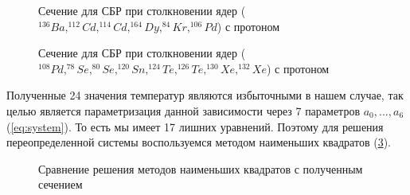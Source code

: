 \documentclass[%
master,    %
natbib,      %
subf,        %
href,        %
colorlinks,  %
]{disser}
\begin{document}
\begin{figure}
 	\caption{Сечение для СБР при столкновении ядер ($^{136}Ba, ^{112}Cd, ^{114}Cd, ^{164}Dy, ^{84}Kr, ^{106}Pd$) с протоном}
 	\label{ris:sigma-full}
\end{figure}
\begin{figure}
	\caption{Сечение для СБР при столкновении ядер ($^{108}Pd, ^{78}Se, ^{80}Se, ^{120}Sn, ^{124}Te, ^{126}Te, ^{130}Xe, ^{132}Xe$) с протоном}
	\label{ris:sigma-full-2}
\end{figure}

Полученные 24 значения температур являются избыточными в нашем случае, так целью является параметризация данной зависимости через 7 параметров $a_0, ..., a_6$ (\ref{eq:system}). То есть мы имеет 17 лишних уравнений. Поэтому для решения переопределенной системы воспользуемся методом наименьших квадратов (\ref{ris:2}).

\begin{figure}[h]
	\caption{Сравнение решения методов наименьших квадратов с полученным сечением}
	\label{ris:2}
\end{figure}
\end{document}
